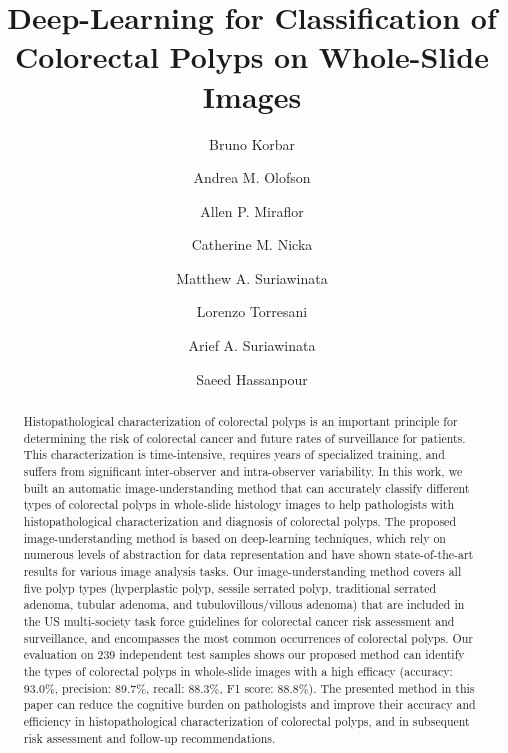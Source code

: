 \documentclass[review]{elsarticle}
\begin{document}
\begin{frontmatter}

\title{Deep-Learning for Classification of Colorectal Polyps on Whole-Slide Images}


\author[biomed,compsci]{Bruno Korbar}
\author[dhmc_footnote]{Andrea M. Olofson}
\author[dhmc_footnote]{Allen P. Miraflor}
\author[dhmc_footnote]{Catherine M. Nicka}
\author[dhmc_footnote]{Matthew A. Suriawinata}
\author[compsci]{Lorenzo Torresani}
\author[dhmc_footnote]{Arief A. Suriawinata}
\author[biomed,compsci,epi]{Saeed Hassanpour}


\address[biomed]{Biomedical Data Science Department, The Geisel School of Medicine at Dartmouth} 
\address[dhmc_footnote]{Department of Pathology and Laboratory Medicine, The Geisel School of Medicine at Dartmouth}
\address[compsci]{Computer Science Department, Dartmouth College}
\address[epi]{Epidemiology Department, The Geisel School of Medicine at Dartmouth}

\begin{abstract}
Histopathological characterization of colorectal polyps is an important
principle for determining the risk of colorectal cancer and future rates of surveillance for patients.
This characterization is time-intensive, requires years of specialized
training, and suffers from significant inter-observer and intra-observer variability.
In this work, we built an automatic image-understanding method that can
accurately classify different types of colorectal polyps in whole-slide histology
images to help pathologists with histopathological characterization and
diagnosis of colorectal polyps. The proposed image-understanding method is based on deep-learning techniques,
which rely on numerous levels of abstraction for data representation
and have shown state-of-the-art results for various image analysis tasks.
Our image-understanding method covers all five polyp types (hyperplastic
polyp, sessile serrated polyp, traditional serrated adenoma, tubular adenoma,
and tubulovillous/villous adenoma) that are included in the US multi-society
task force guidelines for colorectal cancer risk assessment and surveillance,
and encompasses the most common occurrences of colorectal polyps.
Our evaluation on 239 independent test samples shows our proposed method can identify
the types of colorectal polyps in whole-slide images with a high efficacy
(accuracy: 93.0\%, precision: 89.7\%, recall: 88.3\%, F1 score: 88.8\%). 
The presented method in this paper can reduce the cognitive burden on pathologists and improve their accuracy and efficiency
in histopathological characterization of colorectal polyps, and in subsequent risk assessment and follow-up recommendations.


\end{abstract}
\end{frontmatter}
\end{document}
